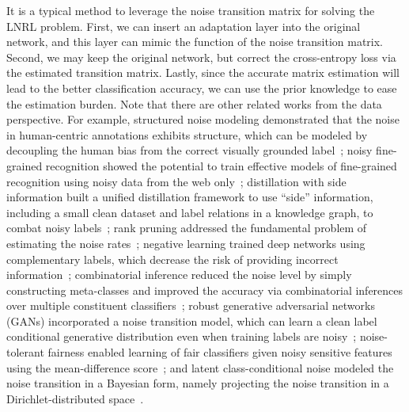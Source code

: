 It is a typical method to leverage the noise transition matrix for solving the LNRL problem. First, we can insert an adaptation layer into the original network, and this layer can mimic the function of the noise transition matrix. Second, we may keep the original network, but correct the cross-entropy loss via the estimated transition matrix. Lastly, since the accurate matrix estimation will lead to the better classification accuracy, we can use the prior knowledge to ease the estimation burden.
Note that there are other related works from the 
data perspective. For example,
structured noise modeling 
demonstrated that the noise in human-centric annotations exhibits structure, which can be modeled by decoupling the human bias from the correct visually grounded label~;
noisy fine-grained recognition showed the potential to train effective models of fine-grained recognition using noisy data from the web only~;
distillation with side information built a unified distillation framework to use ``side'' information, including a small clean dataset and label relations in a knowledge graph, to combat noisy labels~;
rank pruning addressed the fundamental problem of estimating the noise rates~;
negative learning trained deep networks using complementary labels, which decrease the risk of providing incorrect information~; 
combinatorial inference reduced the noise level by simply constructing meta-classes and improved the accuracy via combinatorial inferences over multiple constituent classifiers~; robust generative adversarial networks (GANs) incorporated a noise transition model, which can learn a clean label conditional generative distribution even when training labels are noisy~;
noise-tolerant fairness enabled learning of fair classifiers given noisy sensitive features using the mean-difference score~; and latent class-conditional noise modeled the noise transition in a Bayesian form, namely projecting the noise transition in a Dirichlet-distributed space~.

